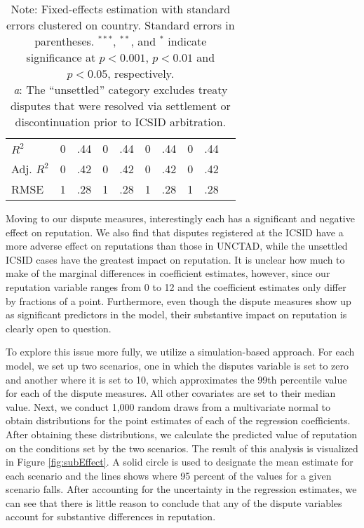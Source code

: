 \documentclass[12pt,onesided]{amsart}
\begin{document}
\begin{savenotes}
\begin{table}[ht]
\begin{tabular}{lr@{} lr@{}lr@{}lr@{}lr@{}}
  $R^{2}$ & 0&.44 & 0&.44 & 0&.44 & 0&.44 \\ 
  Adj. $R^{2}$ & 0&.42 & 0&.42 & 0&.42 & 0&.42 \\ 
  RMSE & 1&.28 & 1&.28 & 1&.28 & 1&.28 \\ 
   \hline\hline
\end{tabular}
\caption*{Note: Fixed-effects estimation with standard errors clustered on country. Standard errors in parentheses. $^{***}$, $^{**}$, and $^{*}$ indicate significance at $p<0.001$, $p<0.01$ and $p<0.05$, respectively. \\ \textit{a}: The ``unsettled'' category excludes treaty disputes that were resolved via settlement or discontinuation prior to ICSID arbitration.}
\end{table}
\end{savenotes}


Moving to our dispute measures, interestingly each has a significant and negative effect on reputation. We also find that disputes registered at the ICSID have a more adverse effect on reputations than those in UNCTAD, while the unsettled ICSID cases have the greatest impact on reputation. It is unclear how much to make of the marginal differences in coefficient estimates, however, since our reputation variable ranges from 0 to 12 and the coefficient estimates only differ by fractions of a point. Furthermore, even though the dispute measures show up as significant predictors in the model, their substantive impact on reputation is clearly open to question. 

To explore this issue more fully, we utilize a simulation-based approach. For each model, we set up two scenarios, one in which the disputes variable is set to zero and another where it is set to 10, which approximates the 99th percentile value for each of the dispute measures. All other covariates are set to their median value. Next, we conduct 1,000 random draws from a multivariate normal to obtain distributions for the point estimates of each of the regression coefficients. After obtaining these distributions, we calculate the predicted value of reputation on the conditions set by the two scenarios. The result of this analysis is visualized in Figure \ref{fig:subEffect}. A solid circle is used to designate the mean estimate for each scenario and the lines shows where 95 percent of the values for a given scenario falls. After accounting for the uncertainty in the regression estimates, we can see that there is little reason to conclude that any of the dispute variables account for substantive differences in reputation.
\end{document}
